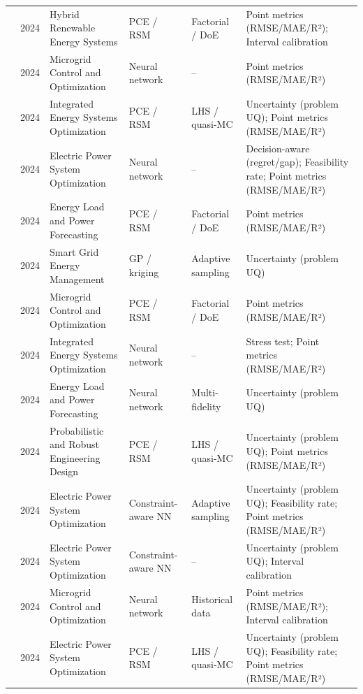 \begin{longtable}{@{}p{} p{} p{} p{} p{} p{}@{}}
  \cite{Ahmad202451} & 2024 & Hybrid Renewable Energy Systems & PCE / RSM & Factorial / DoE & Point metrics (RMSE/MAE/R²); Interval calibration \\
  \cite{Chaturvedi2024149} & 2024 & Microgrid Control and Optimization & Neural network & -- & Point metrics (RMSE/MAE/R²) \\
  \cite{Chaudhry2024} & 2024 & Integrated Energy Systems Optimization & PCE / RSM & LHS / quasi-MC & Uncertainty (problem UQ); Point metrics (RMSE/MAE/R²) \\
  \cite{Chen20244723} & 2024 & Electric Power System Optimization & Neural network & -- & Decision-aware (regret/gap); Feasibility rate; Point metrics (RMSE/MAE/R²) \\
  \cite{Dong2024} & 2024 & Energy Load and Power Forecasting & PCE / RSM & Factorial / DoE & Point metrics (RMSE/MAE/R²) \\
  \cite{Han2024} & 2024 & Smart Grid Energy Management & GP / kriging & Adaptive sampling & Uncertainty (problem UQ) \\
  \cite{Hussien202415075} & 2024 & Microgrid Control and Optimization & PCE / RSM & Factorial / DoE & Point metrics (RMSE/MAE/R²) \\
  \cite{Jahangiri20244849} & 2024 & Integrated Energy Systems Optimization & Neural network & -- & Stress test; Point metrics (RMSE/MAE/R²) \\
  \cite{Khayambashi202453} & 2024 & Energy Load and Power Forecasting & Neural network & Multi-fidelity & Uncertainty (problem UQ) \\
  \cite{Koirala20242284} & 2024 & Probabilistic and Robust Engineering Design & PCE / RSM & LHS / quasi-MC & Uncertainty (problem UQ); Point metrics (RMSE/MAE/R²) \\
  \cite{Lei20247417} & 2024 & Electric Power System Optimization & Constraint-aware NN & Adaptive sampling & Uncertainty (problem UQ); Feasibility rate; Point metrics (RMSE/MAE/R²) \\
  \cite{Liang20246508} & 2024 & Electric Power System Optimization & Constraint-aware NN & -- & Uncertainty (problem UQ); Interval calibration \\
  \cite{Liu20242534} & 2024 & Microgrid Control and Optimization & Neural network & Historical data & Point metrics (RMSE/MAE/R²); Interval calibration \\
  \cite{Pan20244422} & 2024 & Electric Power System Optimization & PCE / RSM & LHS / quasi-MC & Uncertainty (problem UQ); Feasibility rate; Point metrics (RMSE/MAE/R²) \\

\end{longtable}
